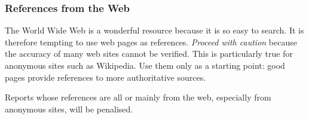 \subsubsection{References from the Web}

The World Wide Web is a wonderful resource because it is so easy to search. It is therefore tempting to use web pages as references. \emph{Proceed with caution} because the accuracy of many web sites cannot be verified. This is particularly true for anonymous sites such as Wikipedia. Use them only as a starting point: good pages provide references to more authoritative sources.

Reports whose references are all or mainly from the web, especially from anonymous sites, will be penalised.
